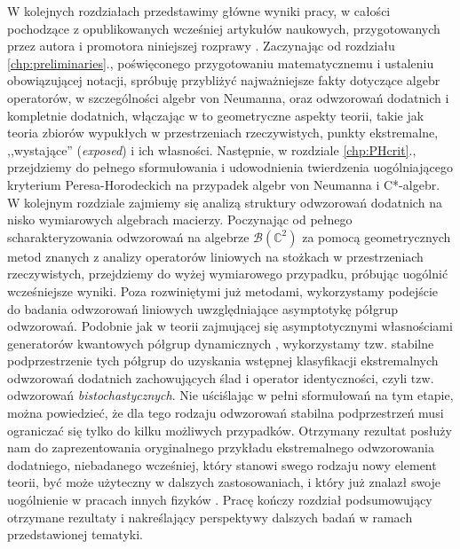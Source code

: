 W kolejnych rozdziałach przedstawimy główne wyniki pracy,
w całości pochodzące z opublikowanych wcześniej artykułów naukowych,
przygotowanych przez autora i promotora niniejszej rozprawy
\cite{miller2015extremal,miller2014horodeckis,miller2015stable,miller2015topology}.
Zaczynając od rozdziału \ref{chp:preliminaries}.,
poświęconego przygotowaniu
matematycznemu i ustaleniu obowiązującej notacji,
spróbuję przybliżyć najważniejsze fakty dotyczące algebr operatorów,
w szczególności algebr von Neumanna,
oraz odwzorowań dodatnich i kompletnie dodatnich,
włączając w to geometryczne aspekty teorii,
takie jak teoria zbiorów wypukłych w przestrzeniach rzeczywistych,
punkty ekstremalne, ,,wystające'' (\emph{exposed}) i ich własności.
Następnie,
w rozdziale \ref{chp:PHcrit}.,
przejdziemy do pełnego sformułowania i udowodnienia twierdzenia
uogólniającego kryterium Peresa-Horodeckich na przypadek algebr von Neumanna
i C*-algebr.
W kolejnym rozdziale zajmiemy się analizą struktury odwzorowań dodatnich na
nisko wymiarowych algebrach macierzy.
Poczynając od pełnego scharakteryzowania odwzorowań na algebrze
$\mathcal{B}(\mathbb{C}^{2})$ za pomocą geometrycznych metod znanych z analizy
operatorów liniowych na stożkach w przestrzeniach rzeczywistych,
przejdziemy do wyżej wymiarowego przypadku,
próbując uogólnić wcześniejsze wyniki.
Poza rozwiniętymi już metodami,
wykorzystamy podejście do badania odwzorowań
liniowych uwzględniające asymptotykę półgrup odwzorowań.
Podobnie jak w teorii
zajmującej się asymptotycznymi własnościami generatorów kwantowych półgrup
dynamicznych \cite{olkiewicz1999environment},
wykorzystamy tzw. stabilne podprzestrzenie tych półgrup do uzyskania
wstępnej klasyfikacji ekstremalnych odwzorowań dodatnich
zachowujących ślad i operator identyczności,
czyli tzw. odwzorowań \emph{bistochastycznych}.
Nie uściślając w pełni sformułowań na tym etapie,
można powiedzieć,
że dla tego rodzaju odwzorowań stabilna podprzestrzeń musi ograniczać się
tylko do kilku możliwych przypadków.
Otrzymany rezultat posłuży nam do zaprezentowania oryginalnego przykładu
ekstremalnego odwzorowania dodatniego, niebadanego wcześniej,
który stanowi swego rodzaju nowy element teorii,
być może użyteczny w dalszych zastosowaniach,
i który już znalazł swoje uogólnienie w pracach innych fizyków
\cite{rutkowski2015class}.
Pracę kończy rozdział podsumowujący otrzymane rezultaty i nakreślający
perspektywy dalszych badań w ramach przedstawionej tematyki.


